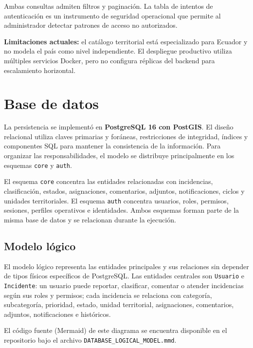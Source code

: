 \documentclass[12pt,a4paper]{article}
\begin{document}
Ambas consultas admiten filtros y paginación. La tabla de intentos de autenticación
es un instrumento de seguridad operacional que permite al administrador detectar
patrones de acceso no autorizados.

\textbf{Limitaciones actuales:} el catálogo territorial está especializado para
Ecuador y no modela el país como nivel independiente. El despliegue productivo
utiliza múltiples servicios Docker, pero no configura réplicas del backend para
escalamiento horizontal.


\section{Base de datos}

La persistencia se implementó en \textbf{PostgreSQL 16 con PostGIS}. El diseño
relacional utiliza claves primarias y foráneas, restricciones de integridad,
índices y componentes SQL para mantener la consistencia de la información.
Para organizar las responsabilidades, el modelo se distribuye principalmente
en los esquemas \texttt{core} y \texttt{auth}.

El esquema \texttt{core} concentra las entidades relacionadas con incidencias,
clasificación, estados, asignaciones, comentarios, adjuntos, notificaciones,
ciclos y unidades territoriales. El esquema \texttt{auth} concentra usuarios,
roles, permisos, sesiones, perfiles operativos e identidades. Ambos esquemas
forman parte de la misma base de datos y se relacionan durante la ejecución.

\subsection{Modelo lógico}

El modelo lógico representa las entidades principales y sus relaciones sin
depender de tipos físicos específicos de PostgreSQL. Las entidades centrales son
\texttt{Usuario} e \texttt{Incidente}: un usuario puede reportar, clasificar,
comentar o atender incidencias según sus roles y permisos; cada incidencia se
relaciona con categoría, subcategoría, prioridad, estado, unidad territorial,
asignaciones, comentarios, adjuntos, notificaciones e históricos.

El código fuente (Mermaid) de este diagrama se encuentra disponible en el repositorio bajo el archivo \texttt{DATABASE\_LOGICAL\_MODEL.mmd}.
\end{document}
